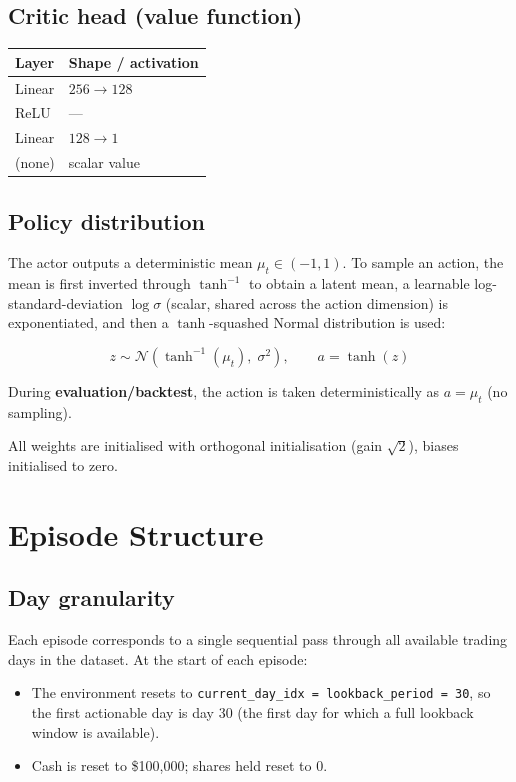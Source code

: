 \documentclass[11pt,a4paper]{article}
\begin{document}
\subsection{Critic head (value function)}

\begin{center}
\begin{tabular}{ll}
\toprule
Layer & Shape / activation \\
\midrule
Linear & $256 \to 128$ \\
ReLU   & --- \\
Linear & $128 \to 1$ \\
(none) & scalar value \\
\bottomrule
\end{tabular}
\end{center}

\subsection{Policy distribution}

The actor outputs a deterministic mean $\mu_t \in (-1,1)$. To sample an action, the mean is first inverted through $\tanh^{-1}$ to obtain a latent mean, a learnable log-standard-deviation $\log\sigma$ (scalar, shared across the action dimension) is exponentiated, and then a $\tanh$-squashed Normal distribution is used:

\[
  z \sim \mathcal{N}(\tanh^{-1}(\mu_t),\;\sigma^2), \qquad a = \tanh(z)
\]

During \textbf{evaluation/backtest}, the action is taken deterministically as $a = \mu_t$ (no sampling).

All weights are initialised with orthogonal initialisation (gain $\sqrt{2}$), biases initialised to zero.

\section{Episode Structure}

\subsection{Day granularity}

Each episode corresponds to a single sequential pass through all available trading days in the dataset. At the start of each episode:
\begin{itemize}
  \item The environment resets to \texttt{current\_day\_idx = lookback\_period = 30}, so the first actionable day is day 30 (the first day for which a full lookback window is available).
  \item Cash is reset to \$100{,}000; shares held reset to 0.
\end{itemize}
\end{document}
